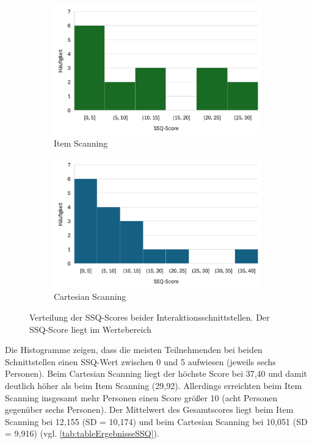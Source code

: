 \begin{figure}
    \centering
    \begin{subfigure}{.5\textwidth}
        \centering
        \includegraphics[width=0.99\textwidth]{images/Results/Histogramm-SSQScores-Item.png}
        \caption{Item Scanning}
        \label{fig:histoSSQItem}   
    \end{subfigure}%
    \begin{subfigure}{.5\textwidth}
        \centering
        \includegraphics[width=0.99\textwidth]{images/Results/Histogramm-SSQScores-Cartesian.png}
         \caption{Cartesian Scanning}
         \label{fig:histoSSQCartesian}
    \end{subfigure}
    \caption{Verteilung der SSQ-Scores beider Interaktionsschnittstellen. Der SSQ-Score liegt im Wertebereich }
    \label{fig:histoSSQScore}
\end{figure}

Die Histogramme zeigen, dass die meisten Teilnehmenden bei beiden Schnittstellen einen SSQ-Wert zwischen 0 und 5 aufwiesen (jeweils sechs Personen). Beim Cartesian Scanning liegt der höchste Score bei 37,40 und damit deutlich höher als beim Item Scanning (29,92). Allerdings erreichten beim Item Scanning insgesamt mehr Personen einen Score größer 10 (acht Personen gegenüber sechs Personen). Der Mittelwert des Gesamtscores liegt beim Item Scanning bei 12,155 (SD = 10,174) und beim Cartesian Scanning bei 10,051 (SD = 9,916) (vgl. \autoref{tab:tableErgebnisseSSQ}).

